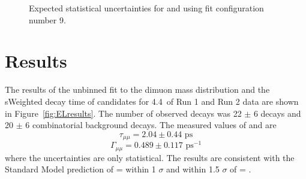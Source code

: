 {\begin{figure}[htbp]
    \caption{Expected statistical uncertainties for \tmumu and \Gmumu using fit configuration number 9.}
    \label{fig:exptuncert}
\end{figure}


\section{Results}
\label{sec:ELresults}

The results of the unbinned \ml fit to the dimuon mass distribution and the sWeighted decay time of \bsmumu candidates for 4.4~\fb of Run 1 and Run 2 data are shown in Figure~\ref{fig:ELresults}. The number of observed decays was 22 $\pm$ 6 \bsmumu decays and 20 $\pm$ 6 combinatorial background decays. The measured values of \tmumu and \Gmumu are
\begin{equation}
\tau_{\mu\mu} = 2.04 \pm 0.44  \text{ ps} 
\end{equation}
\begin{equation}
\Gamma_{\mu\mu} = 0.489  \pm 0.117 \text{ ps}^{-1}
\end{equation}
where the uncertainties are only statistical. The results are consistent with the Standard Model prediction of \tmumu = \tH within  1 $\sigma$ and within  1.5 $\sigma$ of \tmumu = \tL.


}
